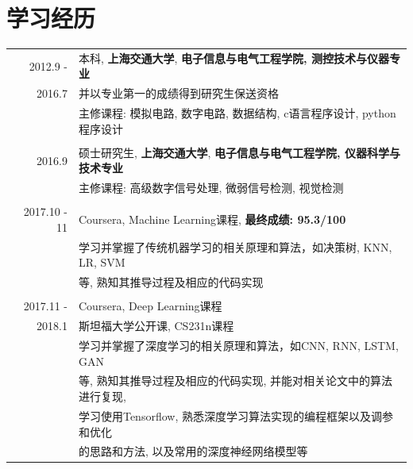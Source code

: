 \documentclass[a4paper,11pt]{article}
\begin{document}
\section{学习经历}
\begin{tabular}{rl}	
  \textsc{2012.9 - } & 本科, \textbf{上海交通大学}, \textbf{电子信息与电气工程学院, 测控技术与仪器专业}\\
  \textsc{2016.7} & 并以专业第一的成绩得到研究生保送资格\\
& 主修课程: 模拟电路, 数字电路, 数据结构, c语言程序设计, python程序设计\\&\\
 \textsc{2016.9  } & 硕士研究生, \textbf{上海交通大学}, \textbf{电子信息与电气工程学院, 仪器科学与技术专业}\\
& 主修课程: 高级数字信号处理, 微弱信号检测, 视觉检测\\&\\
 \textsc{2017.10 - 11} & Coursera, Machine Learning课程, \textbf{最终成绩: 95.3/100}\\
& 学习并掌握了传统机器学习的相关原理和算法，如决策树, KNN, LR, SVM\\
& 等, 熟知其推导过程及相应的代码实现\\&\\
 \textsc{2017.11 - } & Coursera, Deep Learning课程\\
 \textsc{2018.1} & 斯坦福大学公开课, CS231n课程\\
& 学习并掌握了深度学习的相关原理和算法，如CNN, RNN, LSTM, GAN\\
& 等, 熟知其推导过程及相应的代码实现, 并能对相关论文中的算法进行复现,\\
& 学习使用Tensorflow, 熟悉深度学习算法实现的编程框架以及调参和优化\\
& 的思路和方法, 以及常用的深度神经网络模型等\\
\end{tabular}

\end{document}
